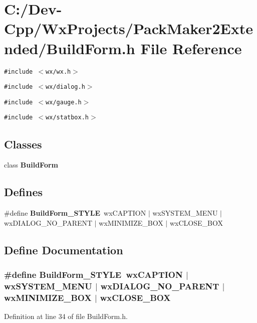 \section{C:/Dev-Cpp/Wx\-Projects/Pack\-Maker2Extended/Build\-Form.h File Reference}
\label{_build_form_8h}
{\tt \#include $<$wx/wx.h$>$}\par
{\tt \#include $<$wx/dialog.h$>$}\par
{\tt \#include $<$wx/gauge.h$>$}\par
{\tt \#include $<$wx/statbox.h$>$}\par
\subsection*{Classes}
\begin{CompactItemize}
\item 
class {\bf Build\-Form}
\end{CompactItemize}
\subsection*{Defines}
\begin{CompactItemize}
\item 
\#define {\bf Build\-Form\_\-STYLE}~wx\-CAPTION $|$ wx\-SYSTEM\_\-MENU $|$ wx\-DIALOG\_\-NO\_\-PARENT $|$ wx\-MINIMIZE\_\-BOX $|$ wx\-CLOSE\_\-BOX
\end{CompactItemize}


\subsection{Define Documentation}
\subsubsection{\setlength{\rightskip}{0pt plus 5cm}\#define Build\-Form\_\-STYLE~wx\-CAPTION $|$ wx\-SYSTEM\_\-MENU $|$ wx\-DIALOG\_\-NO\_\-PARENT $|$ wx\-MINIMIZE\_\-BOX $|$ wx\-CLOSE\_\-BOX}\label{_build_form_8h_8cb1b11d297bc7388af5455c94ac21fc}




Definition at line 34 of file Build\-Form.h.